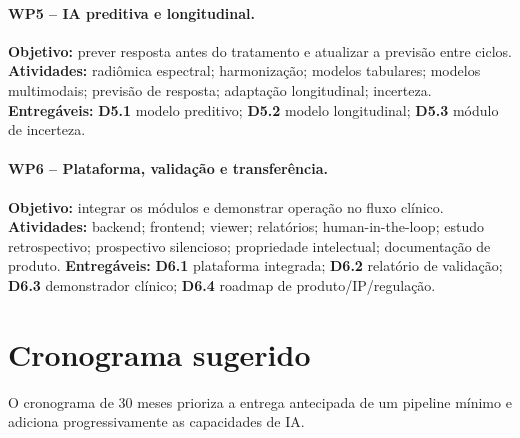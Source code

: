 \documentclass[11pt,a4paper]{article}
\begin{document}
\paragraph{WP5 -- IA preditiva e longitudinal.}
\textbf{Objetivo:} prever resposta antes do tratamento e atualizar a previsão entre ciclos.
\textbf{Atividades:} radiômica espectral; harmonização; modelos tabulares; modelos multimodais; previsão de resposta; adaptação longitudinal; incerteza.
\textbf{Entregáveis:} \textbf{D5.1} modelo preditivo; \textbf{D5.2} modelo longitudinal; \textbf{D5.3} módulo de incerteza.

\paragraph{WP6 -- Plataforma, validação e transferência.}
\textbf{Objetivo:} integrar os módulos e demonstrar operação no fluxo clínico.
\textbf{Atividades:} backend; frontend; viewer; relatórios; human-in-the-loop; estudo retrospectivo; prospectivo silencioso; propriedade intelectual; documentação de produto.
\textbf{Entregáveis:} \textbf{D6.1} plataforma integrada; \textbf{D6.2} relatório de validação; \textbf{D6.3} demonstrador clínico; \textbf{D6.4} roadmap de produto/IP/regulação.

\section{Cronograma sugerido}

O cronograma de 30 meses prioriza a entrega antecipada de um pipeline mínimo e adiciona progressivamente as capacidades de IA.
\end{document}
